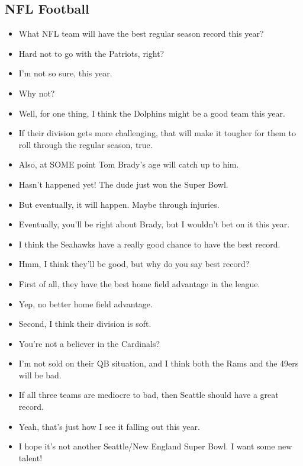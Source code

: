 \documentclass[11pt,a4paper]{article}
\begin{document}
\subsection{NFL Football}
\begin{itemize}
\itemsep0em
\item[\ding{172}] What NFL team will have the best regular season record this year?
\item[\ding{173}] Hard not to go with the Patriots, right?
\item[\ding{172}] I'm not so sure, this year.
\item[\ding{173}] Why not?
\item[\ding{172}] Well, for one thing, I think the Dolphins might be a good team this year.
\item[\ding{173}] If their division gets more challenging, that will make it tougher for them to roll through the regular season, true.
\item[\ding{172}] Also, at SOME point Tom Brady's age will catch up to him.
\item[\ding{173}] Hasn't happened yet! The dude just won the Super Bowl.
\item[\ding{172}] But eventually, it will happen. Maybe through injuries.
\item[\ding{173}] Eventually, you'll be right about Brady, but I wouldn't bet on it this year.
\item[\ding{172}] I think the Seahawks have a really good chance to have the best record.
\item[\ding{173}] Hmm, I think they'll be good, but why do you say best record?
\item[\ding{172}] First of all, they have the best home field advantage in the league.
\item[\ding{173}] Yep, no better home field advantage.
\item[\ding{172}] Second, I think their division is soft.
\item[\ding{173}] You're not a believer in the Cardinals?
\item[\ding{172}] I'm not sold on their QB situation, and I think both the Rams and the 49ers will be bad.
\item[\ding{173}] If all three teams are mediocre to bad, then Seattle should have a great record.
\item[\ding{172}] Yeah, that's just how I see it falling out this year.
\item[\ding{173}] I hope it's not another Seattle/New England Super Bowl. I want some new talent!
\end{itemize}
\end{document}
